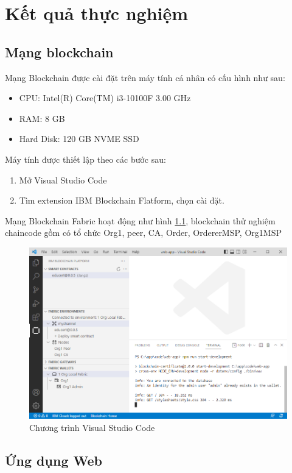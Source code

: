 \chapter{Kết quả thực nghiệm}
\section{Mạng blockchain}

Mạng Blockchain được cài đặt  trên máy tính cá nhân có cấu hình như sau:
\begin{itemize}
\item CPU: Intel(R) Core(TM) i3-10100F 3.00 GHz
\item RAM: 8 GB
\item Hard Disk: 120 GB NVME SSD
\end{itemize}

Máy tính được thiết lập theo các bước sau:
\begin{enumerate}
\item Mở Visual Studio Code 
\item Tìm extension IBM Blockchain Flatform, chọn cài đặt.
\end{enumerate}
Mạng Blockchain Fabric hoạt động như hình \ref{fig:ide_start}, blockchain thử nghiệm chaincode gồm có tổ chức Org1, peer, CA, Order, OrdererMSP, Org1MSP

\begin{figure}[htbp]
\centering
\includegraphics[width=.9\linewidth]{img/ide_start.PNG}
\caption{Chương trình Visual Studio Code}
\label{fig:ide_start}
\end{figure}

\section{Ứng dụng Web}



